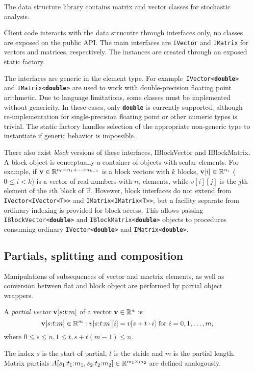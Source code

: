 The data structure library contains matrix and vector classes for
stochastic analysis.

Client code interacts with the data strucutre through interfaces only,
no classes are exposed on the public API. The main interfaces are
\texttt{IVector} and \texttt{IMatrix} for vectors and matrices,
respectively. The instances are created through an exposed static
factory.

The interfaces are generic in the element type. For
example~\texttt{IVector<\textbf{double}>} and
\texttt{IMatrix<\textbf{double}>} are used to work with
double-precision floating point arithmetic. Due to language
limitations, some classes must be implemented without genericity. In
these cases, only \texttt{\textbf{double}} is currently supported,
although re-implementation for single-precision floating point or
other numeric types is trivial. The static factory handles selection
of the appropriate non-generic type to instantiate if generic behavior
is impossible.

There also exist \emph{block} versions of these interfaces,
IBlockVector and IBlockMatrix. A block object is conceptually a
container of objects with scalar elements. For example, if
$\bm{\mathrm{v}} \in \mathbb{R}^{n_0 + n_1 + \cdots + n_{k - 1}}$ is a block vectors
with $k$ blocks, $\bm{\mathrm{v}}[i] \in \mathbb{R}^{n_i}$ ($0 \le i < k$) is a
vector of real numbers with $n_i$ elements, while $v[i][j]$ is the
$j$th element of the $i$th block of $\vec{v}$. Hovewer, block
interfaces do not extend from \texttt{IVector<IVector<T>>} and
\texttt{IMatrix<IMatrix<T>>}, but a facility separate from ordinary
indexing is provided for block access. This allows passing
\texttt{IBlockVector<\textbf{double}>} and
\texttt{IBlockMatrix<\textbf{double}>} objects to procedures consuming
ordinary \texttt{IVector<\textbf{double}>} and
\texttt{IMatrix<\textbf{double}>}.

\subsection{Partials, splitting and composition}

Manipulations of subsequences of vector and mactrix elements, as well
as conversion between flat and block object are performed by partial
object wrappers.

\begin{dfn}
  A \emph{partial vector} $\bm{\mathrm{v}}[s{:}t{:}m]$ of a vector
  $\bm{\mathrm{v}} \in \mathbb{R}^n$ is
  \begin{equation}
    \bm{\mathrm{v}}[s{:}t{:}m] \in \mathbb{R}^m : v[s{:}t{:}m][i] =
    v[s + t \cdot i] \text{ for $i = 0, 1, \ldots, m$,}
  \end{equation}
  where $0 \le s \le n, 1 \le t, s + t (m - 1) \le n$.
\end{dfn}
The index $s$ is the start of partial, $t$ is the stride and $m$ is
the partial length. Matrix partials
$A[s_1{:}t_1{:}m_1, s_2{:}t_2{:}m_2] \in \mathbb{R}^{m_1 \times
  m_2}$ are defined analogously.

